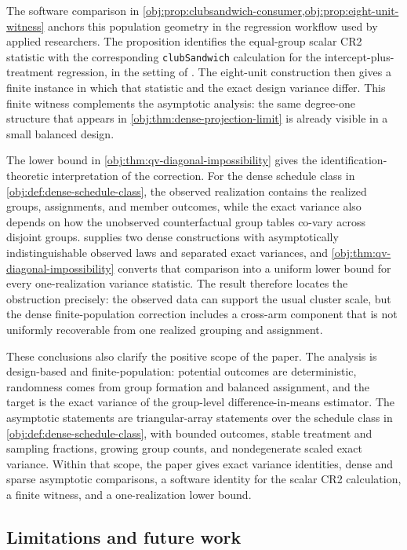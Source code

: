 \documentclass[11pt]{article}
\begin{document}
The software comparison in \cref{obj:prop:clubsandwich-consumer,obj:prop:eight-unit-witness} anchors this population geometry in the regression workflow used by applied researchers. The proposition identifies the equal-group scalar CR2 statistic with the corresponding \texttt{clubSandwich} calculation for the intercept-plus-treatment regression, in the setting of \citet{PustejovskyTipton2018}. The eight-unit construction then gives a finite instance in which that statistic and the exact design variance differ. This finite witness complements the asymptotic analysis: the same degree-one structure that appears in \cref{obj:thm:dense-projection-limit} is already visible in a small balanced design.

The lower bound in \cref{obj:thm:qv-diagonal-impossibility} gives the identification-theoretic interpretation of the correction. For the dense schedule class in \cref{obj:def:dense-schedule-class}, the observed realization contains the realized groups, assignments, and member outcomes, while the exact variance also depends on how the unobserved counterfactual group tables co-vary across disjoint groups.  supplies two dense constructions with asymptotically indistinguishable observed laws and separated exact variances, and \cref{obj:thm:qv-diagonal-impossibility} converts that comparison into a uniform lower bound for every one-realization variance statistic. The result therefore locates the obstruction precisely: the observed data can support the usual cluster scale, but the dense finite-population correction includes a cross-arm component that is not uniformly recoverable from one realized grouping and assignment.

These conclusions also clarify the positive scope of the paper. The analysis is design-based and finite-population: potential outcomes are deterministic, randomness comes from group formation and balanced assignment, and the target is the exact variance of the group-level difference-in-means estimator. The asymptotic statements are triangular-array statements over the schedule class in \cref{obj:def:dense-schedule-class}, with bounded outcomes, stable treatment and sampling fractions, growing group counts, and nondegenerate scaled exact variance. Within that scope, the paper gives exact variance identities, dense and sparse asymptotic comparisons, a software identity for the scalar CR2 calculation, a finite witness, and a one-realization lower bound.

\subsection{Limitations and future work}
\end{document}
